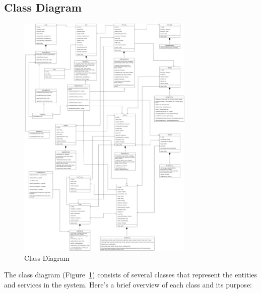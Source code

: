 \subsection{Class Diagram}

\begin{figure}[H]
    \centering
    \includegraphics[width=0.75\textwidth]{sections/BLL/class_diagram.png}
    \caption{Class Diagram}
    \label{fig:my_CD}
\end{figure}

The class diagram (Figure~\ref{fig:my_CD}) consists of several classes that represent the entities and services in the system. Here's a brief overview of each class and its purpose:


